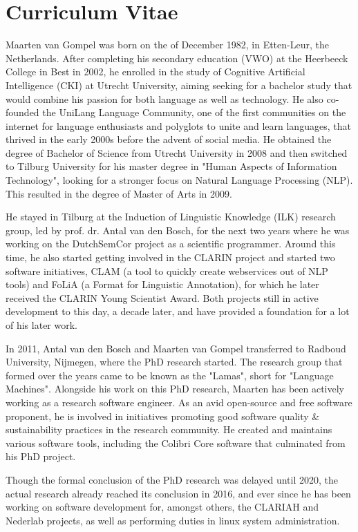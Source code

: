 \chapter*{Curriculum Vitae}

Maarten van Gompel was born on the  of December 1982, in Etten-Leur,
the Netherlands. After completing his secondary education (VWO) at the
Heerbeeck College in Best in 2002, he enrolled in the study of
Cognitive Artificial Intelligence (CKI) at Utrecht University, aiming
seeking for a bachelor study that would combine his
passion for both language as well as technology. He also
co-founded the UniLang Language Community, one of the first communities on the
internet for language enthusiasts and polyglots to unite and learn languages,
that thrived in the early 2000s before the advent of social media. He obtained
the degree of Bachelor of Science from Utrecht University in 2008 and then
switched to Tilburg University for his master degree in "Human Aspects of
Information Technology", looking for a stronger focus on Natural Language
Processing (NLP).  This resulted in the degree of Master of Arts in 2009.

He stayed in Tilburg at the Induction of Linguistic Knowledge (ILK) research
group, led by prof. dr. Antal van den Bosch, for the next two years where he was working on
the DutchSemCor project as a scientific programmer. Around this time, he also
started getting involved in the CLARIN project and started two software
initiatives, CLAM (a tool to quickly create webservices out of NLP tools) and
FoLiA (a Format for Linguistic Annotation), for which he later received the CLARIN Young Scientist Award. Both projects
still in active development to this day, a decade later, and have provided a foundation for a lot of his later work.

In 2011, Antal van den Bosch and Maarten van Gompel transferred to Radboud
University, Nijmegen, where the PhD research started. The research group that
formed over the years came to be known as the "Lamas", short for "Language
Machines".  Alongside his work on this PhD research, Maarten has been actively
working as a research software engineer. As an avid open-source and free
software proponent, he is involved in initiatives promoting good software
quality \& sustainability practices in the research community. He created and
maintains various software tools, including the Colibri Core software that
culminated from his PhD project.

Though the formal conclusion of the PhD research was delayed until 2020, the
actual research already reached its conclusion in 2016, and ever since he has
been working on software development for, amongst others, the CLARIAH and
Nederlab projects, as well as performing duties in linux system administration.
